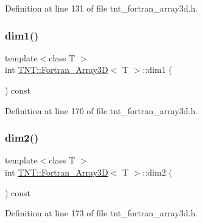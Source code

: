 Definition at line 131 of file tnt\+\_\+fortran\+\_\+array3d.\+h.

\mbox{\label{classTNT_1_1Fortran__Array3D_a1dfd13ee1ae6a14718596441275b2e11}} 
\subsubsection{\texorpdfstring{dim1()}{dim1()}}
{\footnotesize\ttfamily template$<$class T $>$ \\
int \hyperlink{classTNT_1_1Fortran__Array3D}{T\+N\+T\+::\+Fortran\+\_\+\+Array3D}$<$ T $>$\+::dim1 (\begin{DoxyParamCaption}{ }\end{DoxyParamCaption}) const\hspace{0.3cm}{\ttfamily [inline]}}



Definition at line 170 of file tnt\+\_\+fortran\+\_\+array3d.\+h.

\mbox{\label{classTNT_1_1Fortran__Array3D_afbcc13764d51a8939626082d1d549786}} 
\subsubsection{\texorpdfstring{dim2()}{dim2()}}
{\footnotesize\ttfamily template$<$class T $>$ \\
int \hyperlink{classTNT_1_1Fortran__Array3D}{T\+N\+T\+::\+Fortran\+\_\+\+Array3D}$<$ T $>$\+::dim2 (\begin{DoxyParamCaption}{ }\end{DoxyParamCaption}) const\hspace{0.3cm}{\ttfamily [inline]}}



Definition at line 173 of file tnt\+\_\+fortran\+\_\+array3d.\+h.

\mbox{\label{classTNT_1_1Fortran__Array3D_a1c4989f3d7db053c3cb2f6f31fed3c09}} 
